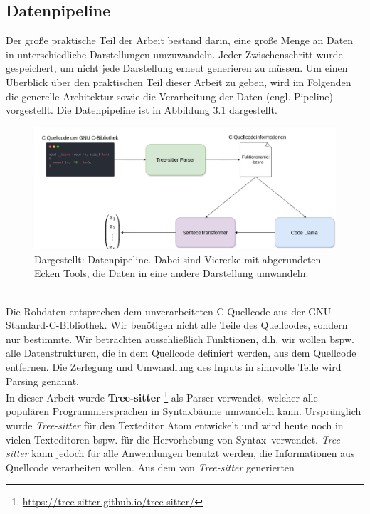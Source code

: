 \documentclass[12pt,letterpaper,ngerman]{article}
\begin{document}
\subsection{Datenpipeline}
Der große praktische Teil der Arbeit bestand darin, eine große 
Menge an Daten in unterschiedliche Darstellungen umzuwandeln. 
Jeder Zwischenschritt wurde gespeichert, um nicht jede Darstellung 
erneut generieren zu müssen. 
Um einen Überblick über den praktischen Teil dieser Arbeit 
zu geben, wird im Folgenden die generelle Architektur sowie 
die Verarbeitung der Daten (engl. Pipeline) vorgestellt.
Die  Datenpipeline ist in Abbildung 3.1 dargestellt.
\begin{figure}
  \begin{center}
    \includegraphics[scale=0.35]{abb/data-pipeline-2.drawio.png}
  \end{center}
  \caption{
    Dargestellt: Datenpipeline. Dabei 
    sind Vierecke mit abgerundeten Ecken Tools, die Daten in eine 
    andere Darstellung umwandeln.
  }
\end{figure}\\
Die Rohdaten entsprechen dem unverarbeiteten 
C-Quellcode aus der GNU-Standard-C-Bibliothek. 
Wir benötigen nicht alle Teile des Quellcodes, sondern nur bestimmte.
Wir betrachten ausschließlich Funktionen, d.h. wir wollen
bspw. alle Datenstrukturen, die in dem Quellcode definiert werden,
aus dem Quellcode entfernen. Die Zerlegung und Umwandlung des
Inputs in sinnvolle Teile wird Parsing genannt.\\
In dieser Arbeit wurde {\bf Tree-sitter} 
\footnote{\url{https://tree-sitter.github.io/tree-sitter/}} als
Parser verwendet, welcher
alle populären Programmiersprachen in Syntaxbäume umwandeln kann.
Ursprünglich wurde \textit{Tree-sitter} für den Texteditor Atom
entwickelt und wird heute noch in vielen Texteditoren bspw. 
für die Hervorhebung von Syntax verwendet.
\textit{Tree-sitter} kann jedoch
für alle Anwendungen benutzt werden, die Informationen aus Quellcode
verarbeiten wollen. Aus dem von \textit{Tree-sitter} generierten
\end{document}
